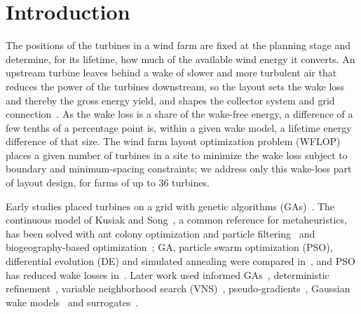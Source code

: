 \section{Introduction}

The positions of the turbines in a wind farm are fixed at the planning stage and determine, for its lifetime, how much of the available wind energy it converts. An upstream turbine leaves behind a wake of slower and more turbulent air that reduces the power of the turbines downstream, so the layout sets the wake loss and thereby the gross energy yield, and shapes the collector system and grid connection~\cite{Srikakulapu2018,Hou2019}. As the wake loss is a share of the wake-free energy, a difference of a few tenths of a percentage point is, within a given wake model, a lifetime energy difference of that size. The wind farm layout optimization problem (WFLOP) places a given number of turbines in a site to minimize the wake loss subject to boundary and minimum-spacing constraints; we address only this wake-loss part of layout design, for farms of up to 36 turbines.

Early studies placed turbines on a grid with genetic algorithms (GAs)~\cite{Mosetti1994,Grady2005}. The continuous model of Kusiak and Song~\cite{Kusiak2010}, a common reference for metaheuristics, has been solved with ant colony optimization and particle filtering~\cite{Eroglu2012,Eroglu2013} and biogeography-based optimization~\cite{Bansal2017}; GA, particle swarm optimization (PSO), differential evolution (DE) and simulated annealing were compared in~\cite{Elkinton2008}, and PSO has reduced wake losses in~\cite{Asaah2021}. Later work used informed GAs~\cite{Ju2019,Bai2022}, deterministic refinement~\cite{Nagpal2021}, variable neighborhood search (VNS)~\cite{Cazzaro2022}, pseudo-gradients~\cite{Quaeghebeur2021}, Gaussian wake models~\cite{Tao2020} and surrogates~\cite{Yang2023,Wang2024,Li2025}.


